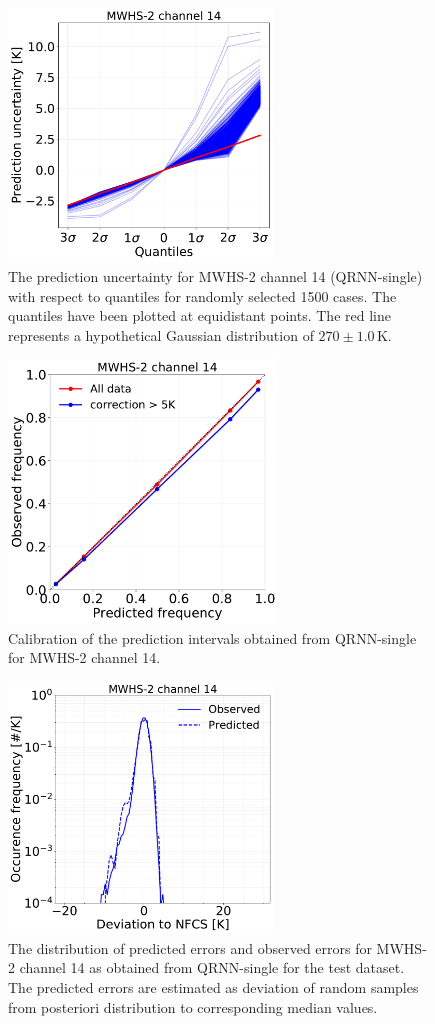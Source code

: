 \documentclass[amt]{copernicus}
\begin{document}
\begin{figure}[t]
	\includegraphics[width = 70mm]{Figures/prediction_uncertainty_MWHS_14.pdf}	
	\caption{The prediction uncertainty for MWHS-2 channel 14 (QRNN-single) with respect to quantiles for randomly selected 1500 cases. The quantiles have been plotted at equidistant points. The red line represents a hypothetical Gaussian distribution of $270\pm1.0$\,K.}
	\label{fig:prediction_uncertainty_mwhs}	
\end{figure}
\begin{figure}[t]
	\includegraphics[height = 70mm]{Figures/calibration_QRNN_MWHS_14.pdf}	
	\caption{Calibration of the prediction intervals obtained from QRNN-single for MWHS-2 channel 14. }
	\label{fig:calibration_mwhs}	
\end{figure}
\begin{figure}[t]
	\includegraphics[width=70mm]{Figures/deviation_posterior_mwhs_samples_14.pdf}	
	\caption{The distribution of predicted errors and observed errors for MWHS-2 channel 14 as obtained from QRNN-single for the test dataset. The predicted errors are estimated as deviation of random samples from posteriori distribution to corresponding median values.}
	\label{fig:predicted_errors_mwhs}	
\end{figure}
\end{document}
